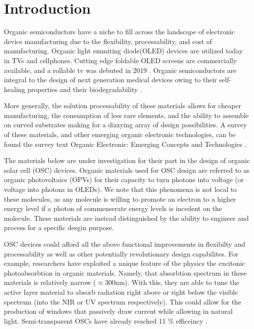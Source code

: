 \chapter{Introduction} 
Organic semiconductors have a niche to fill across the landscape of electronic
device manufacturing due to the flexibility, processability, and cost of manufacturing. 
Organic light emmiting diode(OLED) devices are utilized today in TVs and cellphones.  
Cutting edge foldable OLED screens are commercially available, and a rollable tv was debuted in 2019
\cite{Chen2020}. 
Organic semiconductors are integral to the design of next generation medical devices owing to their
self-healing properties and their biodegradability \cite{Bettinger2010}. 

More generally, the solution processability of these materials allows for
cheaper manufacturing, the consumption of less rare elements, 
and the ability to assemble on curved substrates making for a dizzying array of design possibilities. 
A survey of these materials, and 
other emerging organic electronic technologies, can be found the survey text 
Organic Electronic: Emerging Concepts and Technologies
\cite{FabioCicoiraEditor2013}. 

The materials below are under investigation for their part in the design of organic solar cell (OSC) devices. 
Organic materials used for OSC design are referred to as organic photovoltaics (OPVs) for their capacity
to turn photons into voltage (or voltage into photons in OLEDs). We note that this phenomena is not
local to these molecules, as any molecule is willing to promote an electron to a higher energy level if a
photon of commenserate energy levels is incedent on the molecule. These materials are instead distinguished by
the ability to engineer and process for a specific desgin purpose. 

OSC devices could afford all the above functional improvements in flexibilty and processability as well as other
potentially revolutionary design capabilites.  
For example, researchers have exploited a unique feature of the physics the excitonic photoabsorbtion in 
organic materials.  Namely, that absorbtion spectrum
in these materials is relatively narrow ($\approx$300nm).
With this, they are able to tune the active layer material to absorb radiation right above or right below the
visible spectrum (into the NIR or UV spectrum respectively). This 
could allow for the production of windows that passively draw current while allowing in natural light. Semi-transparent OSCs have already
reached 11 \% efficeincy \cite{Brabec2020}. 

